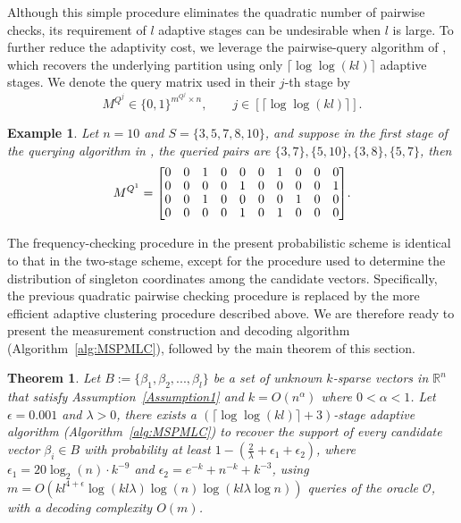\documentclass{article}
\newcommand\mc{\mathcal}
\newtheorem{theorem}{Theorem}[section]
\newtheorem{example}{Example}[section]
\begin{document}
Although this simple procedure eliminates the quadratic number of pairwise checks, its requirement of $l$ adaptive stages can be undesirable when $l$ is large. To further reduce the adaptivity cost, we leverage the pairwise-query algorithm of \cite[Theorem~1.1]{black2025learning}, which recovers the underlying partition using only $\lceil\log\log(kl)\rceil$ adaptive stages. We denote the query matrix used in their $j$-th stage by
\[
M^{Q^j}\in\{0,1\}^{m^{Q^j}\times n},
\qquad j\in[\lceil\log\log(kl)\rceil].
\]

\begin{example}\label{exp5.1}
    Let $n=10$ and $S=\{3,5,7,8,10\}$, and suppose in the first stage of the querying algorithm in \cite[Theorem~1.1]{black2025learning}, the queried pairs are $\{3,7\},\{5,10\},\{3,8\},\{5,7\}$, then 
    \[M^{Q^1}={
   \renewcommand{\arraystretch}{0.9}
   \begin{bmatrix}
        0 & 0 & 1 & 0 & 0 & 0 & 1 & 0 & 0 & 0 \\
        0 & 0 & 0 & 0 & 1 & 0 & 0 & 0 & 0 & 1 \\
        0 & 0 & 1 & 0 & 0 & 0 & 0 & 1 & 0 & 0 \\
        0 & 0 & 0 & 0 & 1 & 0 & 1 & 0 & 0 & 0 
    \end{bmatrix}}.
    \]
\end{example}

The frequency-checking procedure in the present probabilistic scheme is identical to that in the two-stage scheme, except for the procedure used to determine the distribution of singleton coordinates among the candidate vectors. Specifically, the previous quadratic pairwise checking procedure is replaced by the more efficient adaptive clustering procedure described above. We are therefore ready to present the measurement construction and decoding algorithm (Algorithm~\ref{alg:MSPMLC}), followed by the main theorem of this section.

\begin{theorem}\label{thm2}
    Let $B:=\{\beta_1,\beta_2,...,\beta_l\}$ be a set of unknown $k$-sparse vectors in $\mathbb{R}^n$ that satisfy Assumption~\ref{Assumption1} and $k=O(n^\alpha)$ where $0<\alpha<1$. Let $\epsilon=0.001$ and $\lambda>0$, there exists a $(\lceil\log\log (kl)\rceil+3)$-stage adaptive algorithm (Algorithm~\ref{alg:MSPMLC}) to recover the support of every candidate vector $\beta_i\in B$ with probability at least $1 - (\frac{2}{\lambda}+\epsilon_1+\epsilon_2)$, where $\epsilon_1=20\log_2(n)\cdot k^{-9}$ and $\epsilon_2=e^{-k}+n^{-k}+k^{-3}$, using $m=O(kl^{4+\epsilon}\log(kl\lambda)\log (n)\log (kl\lambda\log n))$ queries of the oracle $\mc{O}$, with a decoding complexity $O(m)$. 
\end{theorem}
\end{document}
